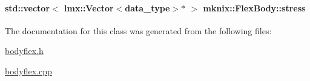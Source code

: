 \hypertarget{classmknix_1_1_flex_body_ab7e82d08982714b26de3fff2a281d4f2}{
\paragraph[{stress}]{\setlength{\rightskip}{0pt plus 5cm}std\-::vector$<$ lmx\-::\-Vector$<${\bf data\-\_\-type}$>$$\ast$ $>$ mknix\-::\-Flex\-Body\-::stress\hspace{0.3cm}{\ttfamily [protected]}}}\label{classmknix_1_1_flex_body_ab7e82d08982714b26de3fff2a281d4f2}


The documentation for this class was generated from the following files\-:\begin{DoxyCompactItemize}
\item 
\hyperlink{bodyflex_8h}{bodyflex.\-h}\item 
\hyperlink{bodyflex_8cpp}{bodyflex.\-cpp}\end{DoxyCompactItemize}
